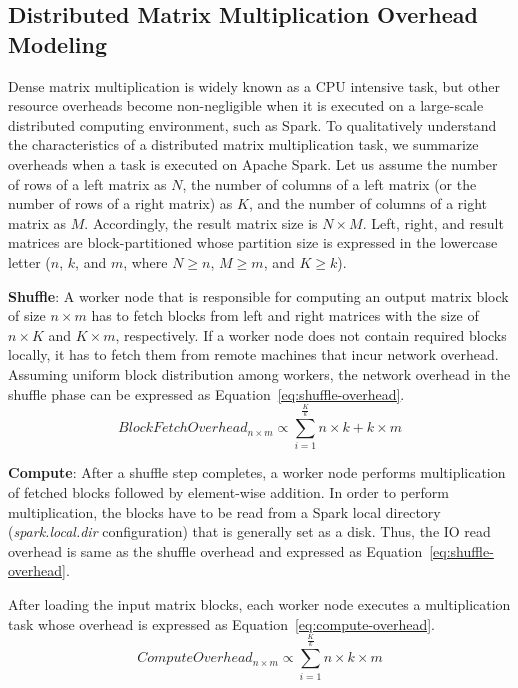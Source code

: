 \documentclass[10pt, conference, compsocconf]{IEEEtran}
\begin{document}
\subsection{Distributed Matrix Multiplication Overhead Modeling}\label{sec:overhead-modeling}
Dense matrix multiplication is widely known as a CPU intensive task, but other resource overheads become non-negligible when it is executed on a large-scale distributed computing environment, such as Spark. To qualitatively understand the characteristics of a distributed matrix multiplication task, we summarize overheads when a task is executed on Apache Spark. Let us assume the number of rows of a left matrix as $N$, the number of columns of a left matrix (or the number of rows of a right matrix) as $K$, and the number of columns of a right matrix as $M$. Accordingly, the result matrix size is $N \times M$. Left, right, and result matrices are block-partitioned whose partition size is expressed in the lowercase letter ($n$, $k$, and $m$, where $N \geq n$, $M \geq m$, and $K \geq k$). 

\textbf{Shuffle}: A worker node that is responsible for computing an output matrix block of size $n \times m$ has to fetch blocks from left and right matrices with the size of $n \times K$ and $K \times m$, respectively. If a worker node does not contain required blocks locally, it has to fetch them from remote machines that incur network overhead. Assuming uniform block distribution among workers, the network overhead in the shuffle phase can be expressed as Equation~\ref{eq:shuffle-overhead}.
\begin{equation}\label{eq:shuffle-overhead}
  BlockFetchOverhead_{n \times m} \propto \sum\limits_{i=1}^{\frac{K}{k}} n \times k + k \times m
\end{equation}

\textbf{Compute}: After a shuffle step completes, a worker node performs multiplication of fetched blocks followed by element-wise addition. In order to perform multiplication, the blocks have to be read from a Spark local directory (\textit{spark.local.dir} configuration) that is generally set as a disk. Thus, the IO read overhead is same as the shuffle overhead and expressed as Equation~\ref{eq:shuffle-overhead}.

After loading the input matrix blocks, each worker node executes a multiplication task whose overhead is expressed as Equation~\ref{eq:compute-overhead}.
\begin{equation}\label{eq:compute-overhead}
  ComputeOverhead_{n \times m} \propto \sum\limits_{i=1}^{\frac{K}{k}} n \times k \times m
\end{equation}
\end{document}
